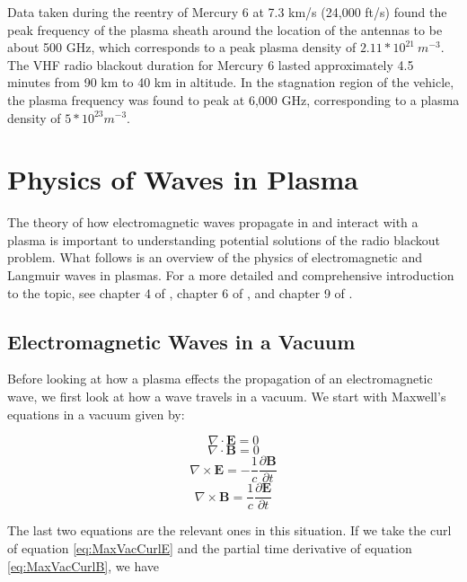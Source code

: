 \documentclass[twocolumn]{article}
\begin{document}
Data taken during the reentry of Mercury 6 at 7.3 km/s (24,000 ft/s) found the peak frequency of the plasma sheath around the location of the antennas to be about 500 GHz, which corresponds to a peak plasma density of $2.11*10^{21} \  m^{-3}$.
The VHF radio blackout duration for Mercury 6 lasted approximately 4.5 minutes from 90 km to 40 km in altitude.
In the stagnation region of the vehicle, the plasma frequency was found to peak at 6,000 GHz, corresponding to a plasma density of $5*10^{23} m^{-3}$. \cite{lehnert_plasma_1964}


\section{Physics of Waves in Plasma} \label{sec:Waves}
The theory of how electromagnetic waves propagate in and interact with a plasma is important to understanding potential solutions of the radio blackout problem.
What follows is an overview of the physics of electromagnetic and Langmuir waves in plasmas.
For a more detailed and comprehensive introduction to the topic, see chapter 4 of \cite{chen_introduction_1984}, chapter 6 of \cite{papas_theory_1965}, and chapter 9 of \cite{fitzpatrick_maxwells_2008}.

\subsection*{Electromagnetic Waves in a Vacuum}
Before looking at how a plasma effects the propagation of an electromagnetic wave, we first look at how a wave travels in a vacuum.
We start with Maxwell's equations in a vacuum given by:

\begin{equation}
	\nabla \cdot \mathbf{E} = 0
\end{equation}
\begin{equation}
	\nabla \cdot \mathbf{B} = 0
\end{equation}
\begin{equation} 
	\label{eq:MaxVacCurlE}
	\nabla \times \mathbf{E} = -\frac{1}{c} \frac{\partial \mathbf{B}}{\partial t}
\end{equation}
\begin{equation} 
	\label{eq:MaxVacCurlB}
	\nabla \times \mathbf{B} = \frac{1}{c} \frac{\partial \mathbf{E}}{\partial t}
\end{equation}

The last two equations are the relevant ones in this situation.
If we take the curl of equation \ref{eq:MaxVacCurlE} and the partial time derivative of equation \ref{eq:MaxVacCurlB}, we have
\end{document}
